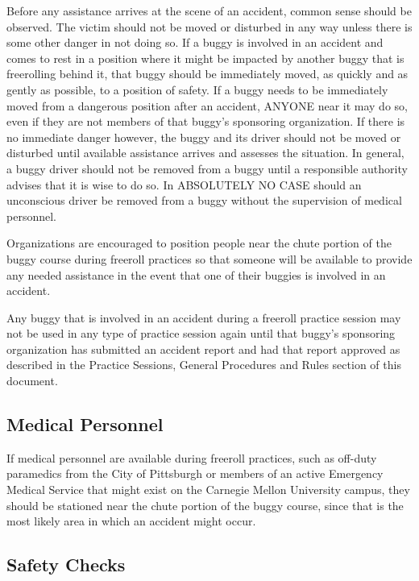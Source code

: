 	Before any assistance arrives at the scene of an accident, common sense should
	be observed. The victim should not be moved or disturbed in any way unless
	there is some other danger in not doing so. If a buggy is involved in an
	accident and comes to rest in a position where it might be impacted by another
	buggy that is freerolling behind it, that buggy should be immediately moved, as
	quickly and as gently as possible, to a position of safety. If a buggy needs to
	be immediately moved from a dangerous position after an accident, ANYONE near
	it may do so, even if they are not members of that buggy's sponsoring
	organization. If there is no immediate danger however, the buggy and its driver
	should not be moved or disturbed until available assistance arrives and
	assesses the situation. In general, a buggy driver should not be removed from a
	buggy until a responsible authority advises that it is wise to do so. In
	ABSOLUTELY NO CASE should an unconscious driver be removed from a buggy without
	the supervision of medical personnel.

	Organizations are encouraged to position people near the chute portion of the
	buggy course during freeroll practices so that someone will be available to
	provide any needed assistance in the event that one of their buggies is
	involved in an accident.

	Any buggy that is involved in an accident during a freeroll practice session
	may not be used in any type of practice session again until that buggy's
	sponsoring organization has submitted an accident report and had that report
	approved as described in the Practice Sessions, General Procedures and Rules
	section of this document.

\subsection{Medical Personnel}

	If medical personnel are available during freeroll practices, such as off-duty
	paramedics from the City of Pittsburgh or members of an active Emergency
	Medical Service that might exist on the Carnegie Mellon University campus, they
	should be stationed near the chute portion of the buggy course, since that is
	the most likely area in which an accident might occur.

\subsection{Safety Checks}

